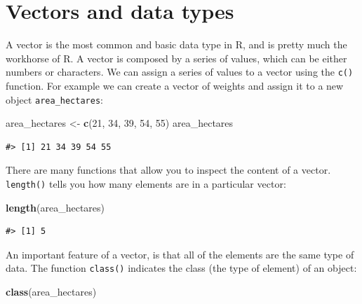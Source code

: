 \documentclass[
]{book}
\newenvironment{Shaded}{\begin{snugshade}}{\end{snugshade}}
\newcommand{\DecValTok}[1]{\textcolor[rgb]{0.00,0.00,0.81}{#1}}
\newcommand{\FunctionTok}[1]{\textcolor[rgb]{0.13,0.29,0.53}{\textbf{#1}}}
\newcommand{\NormalTok}[1]{#1}
\newcommand{\OtherTok}[1]{\textcolor[rgb]{0.56,0.35,0.01}{#1}}
\begin{document}
\hypertarget{vectors-and-data-types}{%
\section{Vectors and data types}\label{vectors-and-data-types}}

A vector is the most common and basic data type in R, and is pretty much
the workhorse of R. A vector is composed by a series of values, which can be
either numbers or characters. We can assign a series of values to a vector using
the \texttt{c()} function. For example we can create a vector of weights and assign
it to a new object \texttt{area\_hectares}:

\begin{Shaded}
\begin{Highlighting}[]
\NormalTok{area\_hectares }\OtherTok{\textless{}{-}} \FunctionTok{c}\NormalTok{(}\DecValTok{21}\NormalTok{, }\DecValTok{34}\NormalTok{, }\DecValTok{39}\NormalTok{, }\DecValTok{54}\NormalTok{, }\DecValTok{55}\NormalTok{)}
\NormalTok{area\_hectares}
\end{Highlighting}
\end{Shaded}

\begin{verbatim}
#> [1] 21 34 39 54 55
\end{verbatim}

There are many functions that allow you to inspect the content of a
vector. \texttt{length()} tells you how many elements are in a particular vector:

\begin{Shaded}
\begin{Highlighting}[]
\FunctionTok{length}\NormalTok{(area\_hectares)}
\end{Highlighting}
\end{Shaded}

\begin{verbatim}
#> [1] 5
\end{verbatim}

An important feature of a vector, is that all of the elements are the same type of data.
The function \texttt{class()} indicates the class (the type of element) of an object:

\begin{Shaded}
\begin{Highlighting}[]
\FunctionTok{class}\NormalTok{(area\_hectares)}
\end{Highlighting}
\end{Shaded}
\end{document}
